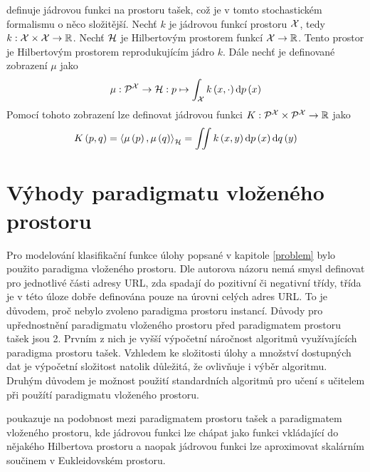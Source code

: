\cite{muandet_learning_2012} definuje jádrovou funkci na prostoru tašek, což je v tomto stochastickém formalismu o něco složitější. Nechť \( k \) je jádrovou funkcí prostoru \( \mathcal X \), tedy \( k : \mathcal X \times \mathcal X \to \mathbb R \). Nechť \( \mathcal H \) je Hilbertovým prostorem funkcí \( \mathcal X \to \mathbb R \). Tento prostor je Hilbertovým prostorem reprodukujícím jádro \( k \). Dále nechť je definované zobrazení \( \mu \) jako
\[ \mu : \mathcal P^{\mathcal X} \to \mathcal H : p \mapsto \int_{\mathcal X} k \left( x, \cdot \right) \mathrm{d}p \left( x \right) \]
Pomocí tohoto zobrazení lze definovat jádrovou funkci \( K : \mathcal P^{\mathcal X} \times \mathcal P^{\mathcal X} \to \mathbb R \) jako
\[ K \left( p, q \right) = \braket{\mu \left( p \right) , \mu \left( q \right)}_{\mathcal H} = \iint k \left( x, y \right) \mathrm{d} p \left( x \right) \mathrm{d} q \left( y \right) \]

\section{Výhody paradigmatu vloženého prostoru}
Pro modelování klasifikační funkce úlohy popsané v kapitole \ref{problem} bylo použito paradigma vloženého prostoru. Dle autorova názoru nemá smysl definovat pro jednotlivé části adresy URL, zda spadají do pozitivní či negativní třídy, třída je v této úloze dobře definována pouze na úrovni celých adres URL. To je důvodem, proč nebylo zvoleno paradigma prostoru instancí. Důvody pro upřednostnění paradigmatu vloženého prostoru před paradigmatem prostoru tašek jsou 2. Prvním z nich je vyšší výpočetní náročnost algoritmů využívajících paradigma prostoru tašek. Vzhledem ke složitosti úlohy a množství dostupných dat je výpočetní složitost natolik důležitá, že ovlivňuje i výběr algoritmu. Druhým důvodem je možnost použití standardních algoritmů pro učení s učitelem při použítí paradigmatu vloženého prostoru.
\begin{remark}
	\cite{pevny_using_2016} poukazuje na podobnost mezi paradigmatem prostoru tašek a paradigmatem vloženého prostoru, kde jádrovou funkci lze chápat jako funkci vkládající do nějakého Hilbertova prostoru a naopak jádrovou funkci lze aproximovat skalárním součinem v Eukleidovském prostoru.
\end{remark}
